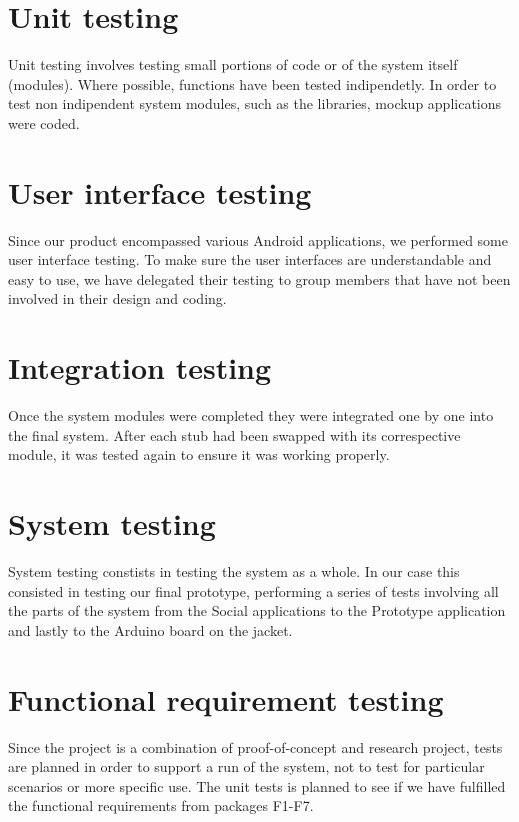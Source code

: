 
\section{Unit testing}
Unit testing involves testing small portions of code or of the system itself
(modules). Where possible, functions have been tested indipendetly. In order to
test non indipendent system modules, such as the libraries, mockup applications
were coded.

\section{User interface testing}
Since our product encompassed various Android applications, we performed some
user interface testing. To make sure the user interfaces are understandable and
easy to use, we have delegated their testing to group members that have not been
involved in their design and coding.

\section{Integration testing}
Once the system modules were completed they were integrated one by one into the
final system. After each stub had been swapped with its correspective module,
it was tested again to ensure it was working properly.

\section{System testing}
System testing constists in testing the system as a whole.
In our case this consisted in testing our final prototype, performing a series
of tests involving all the parts of the system from the Social applications to
the Prototype application and lastly to the Arduino board on the jacket.

\section{Functional requirement testing}
Since the project is a combination of proof-of-concept and research project,
tests are planned in order to support a run of the system, not to test for
particular scenarios or more specific use. The unit tests is planned to see if
we have fulfilled the functional requirements from packages F1-F7.

